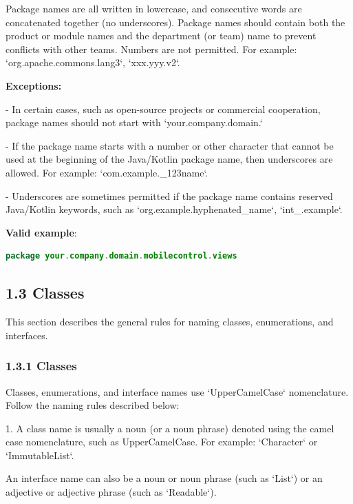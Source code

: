 Package names are all written in lowercase, and consecutive words are concatenated together (no underscores). Package names should contain both the product or module names and the department (or team) name to prevent conflicts with other teams.  Numbers are not permitted. For example: `org.apache.commons.lang3`, `xxx.yyy.v2`.



\textbf{Exceptions:} 



- In certain cases, such as open-source projects or commercial cooperation, package names should not start with `your.company.domain.`

- If the package name starts with a number or other character that cannot be used at the beginning of the Java/Kotlin package name, then underscores are allowed. For example: `com.example._123name`.

- Underscores are sometimes permitted if the package name contains reserved Java/Kotlin keywords, such as `org.example.hyphenated_name`, `int_.example`.



\textbf{Valid example}: 

\begin{lstlisting}[language=Kotlin]
package your.company.domain.mobilecontrol.views
\end{lstlisting}


\subsection*{\textbf{1.3 Classes}}

This section describes the general rules for naming classes, enumerations, and interfaces.

\subsubsection*{\textbf{1.3.1 Classes}}
\leavevmode\newline

Classes, enumerations, and interface names use `UpperCamelCase` nomenclature. Follow the naming rules described below:

1.	A class name is usually a noun (or a noun phrase) denoted using the camel case nomenclature, such as UpperCamelCase. For example: `Character` or `ImmutableList`.

An interface name can also be a noun or noun phrase (such as `List`) or an adjective or adjective phrase (such as `Readable`).

